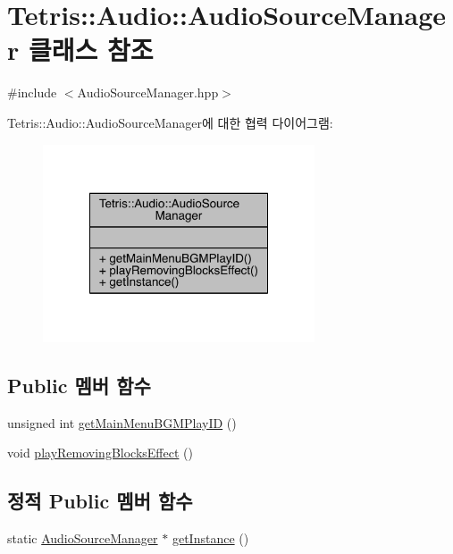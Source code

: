 \hypertarget{class_tetris_1_1_audio_1_1_audio_source_manager}{}\section{Tetris\+:\+:Audio\+:\+:Audio\+Source\+Manager 클래스 참조}
\label{class_tetris_1_1_audio_1_1_audio_source_manager}


{\ttfamily \#include $<$Audio\+Source\+Manager.\+hpp$>$}



Tetris\+:\+:Audio\+:\+:Audio\+Source\+Manager에 대한 협력 다이어그램\+:
\nopagebreak
\begin{figure}[H]
\begin{center}
\leavevmode
\includegraphics[width=228pt]{class_tetris_1_1_audio_1_1_audio_source_manager__coll__graph}
\end{center}
\end{figure}
\subsection*{Public 멤버 함수}
\begin{DoxyCompactItemize}
\item 
unsigned int \hyperlink{class_tetris_1_1_audio_1_1_audio_source_manager_a64d6e7c7f0849d5de7cc26898079986c}{get\+Main\+Menu\+B\+G\+M\+Play\+ID} ()
\item 
void \hyperlink{class_tetris_1_1_audio_1_1_audio_source_manager_a44c761f0200291a2c8f282d8d52aa081}{play\+Removing\+Blocks\+Effect} ()
\end{DoxyCompactItemize}
\subsection*{정적 Public 멤버 함수}
\begin{DoxyCompactItemize}
\item 
static \hyperlink{class_tetris_1_1_audio_1_1_audio_source_manager}{Audio\+Source\+Manager} $\ast$ \hyperlink{class_tetris_1_1_audio_1_1_audio_source_manager_a561c580924ee6a13e6453b2d94764548}{get\+Instance} ()
\end{DoxyCompactItemize}


